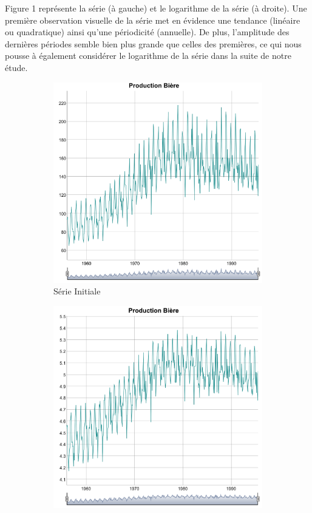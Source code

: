 \documentclass[12pt,a4paper]{book}
\newcommand{\1}{\mathds{1}}
\begin{document}
\vspace{10 mm}
Figure 1 représente la série (à gauche) et le logarithme de la série (à droite). 
Une première observation visuelle de la série met en évidence une tendance (linéaire ou quadratique) ainsi qu'une périodicité (annuelle). De plus, l'amplitude des dernières périodes semble bien plus grande que celles des premières, ce qui nous pousse à également considérer le logarithme de la série dans la suite de notre étude.

\begin{figure}[h!]
\centering
	\begin{subfigure}{.5\textwidth}
    	\includegraphics[scale=0.4]{plot_beer}  
    	\caption{Série Initiale}
    	\label{fig:sub1}
    \end{subfigure}
    \begin{subfigure}{.4\textwidth}
    	\includegraphics[scale=0.4]{Log_Series}  

\end{subfigure}
\end{figure}
\end{document}
